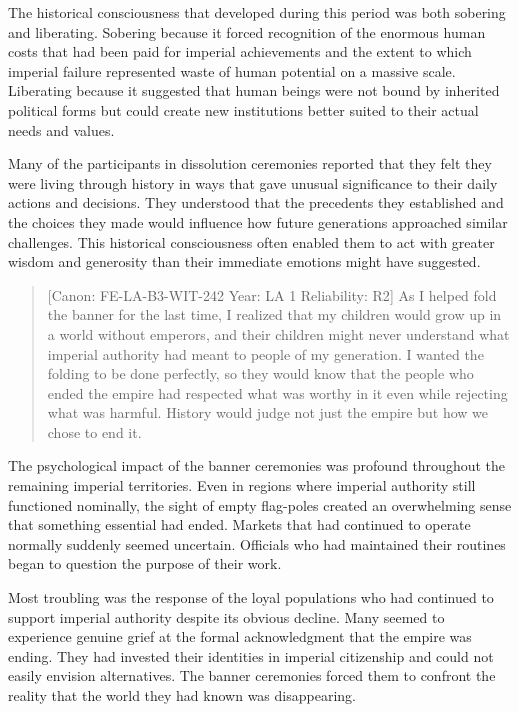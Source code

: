 The historical consciousness that developed during this period was both
sobering and liberating. Sobering because it forced recognition of the
enormous human costs that had been paid for imperial achievements and
the extent to which imperial failure represented waste of human
potential on a massive scale. Liberating because it suggested that human
beings were not bound by inherited political forms but could create new
institutions better suited to their actual needs and values.

Many of the participants in dissolution ceremonies reported that they
felt they were living through history in ways that gave unusual
significance to their daily actions and decisions. They understood that
the precedents they established and the choices they made would
influence how future generations approached similar challenges. This
historical consciousness often enabled them to act with greater wisdom
and generosity than their immediate emotions might have suggested.

\begin{quote}
{[}Canon: FE-LA-B3-WIT-242 \textbar{} Year: LA 1 \textbar{} Reliability:
R2{]} As I helped fold the banner for the last time, I realized that my
children would grow up in a world without emperors, and their children
might never understand what imperial authority had meant to people of my
generation. I wanted the folding to be done perfectly, so they would
know that the people who ended the empire had respected what was worthy
in it even while rejecting what was harmful. History would judge not
just the empire but how we chose to end it.
\end{quote}

The psychological impact of the banner ceremonies was profound
throughout the remaining imperial territories. Even in regions where
imperial authority still functioned nominally, the sight of empty
flag-poles created an overwhelming sense that something essential had
ended. Markets that had continued to operate normally suddenly seemed
uncertain. Officials who had maintained their routines began to question
the purpose of their work.

Most troubling was the response of the loyal populations who had
continued to support imperial authority despite its obvious decline.
Many seemed to experience genuine grief at the formal acknowledgment
that the empire was ending. They had invested their identities in
imperial citizenship and could not easily envision alternatives. The
banner ceremonies forced them to confront the reality that the world
they had known was disappearing.

